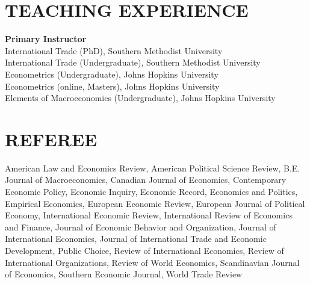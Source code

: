 \documentclass[11pt]{res}
\begin{document}
\begin{resume}
\section{TEACHING EXPERIENCE} \vspace{1.5mm}
{\bf Primary Instructor}\vspace{1.5mm}\\
International Trade (PhD), Southern Methodist University\vspace{1.5mm}\\
International Trade (Undergraduate), Southern Methodist University\vspace{1.5mm}\\
Econometrics (Undergraduate), Johns Hopkins University\vspace{1.5mm}\\
Econometrics (online, Masters), Johns Hopkins University\vspace{1.5mm}\\
Elements of Macroeconomics (Undergraduate), Johns Hopkins University\vspace{1.5mm}\\

\section{REFEREE} \vspace{1.5mm}
American Law and Economics Review, American Political Science Review, B.E. Journal of Macroeconomics, Canadian Journal of Economics, Contemporary Economic Policy, Economic Inquiry, 
Economic Record, Economics and Politics, Empirical Economics, European Economic Review, European Journal of Political Economy, International Economic Review, International Review of Economics and Finance, Journal of Economic Behavior and Organization, Journal of International Economics, Journal of International Trade and Economic Development, Public Choice, Review of International Economics, Review of International Organizations, Review of World Economics, Scandinavian Journal of Economics, Southern Economic Journal, World Trade Review
\end{resume}
\end{document}
